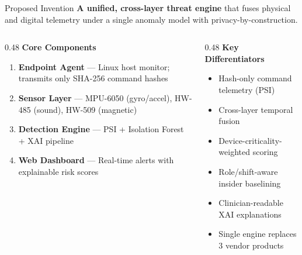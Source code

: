 \documentclass[10pt, aspectratio=169]{beamer}
\begin{document}
\begin{frame}{Proposed Invention}
  \textbf{A unified, cross-layer threat engine} that fuses physical and digital telemetry
  under a single anomaly model with privacy-by-construction.
  \vspace{6pt}
  \begin{columns}[T]
    \begin{column}{0.48\textwidth}
      \textbf{\textcolor{patentblue}{Core Components}}
      \begin{enumerate}
        \item \textbf{Endpoint Agent} — Linux host monitor; transmits only SHA-256 command hashes
        \item \textbf{Sensor Layer} — MPU-6050 (gyro/accel), HW-485 (sound), HW-509 (magnetic)
        \item \textbf{Detection Engine} — PSI + Isolation Forest + XAI pipeline
        \item \textbf{Web Dashboard} — Real-time alerts with explainable risk scores
      \end{enumerate}
    \end{column}
    \begin{column}{0.48\textwidth}
      \textbf{\textcolor{patentblue}{Key Differentiators}}
      \begin{itemize}
        \item Hash-only command telemetry (PSI)
        \item Cross-layer temporal fusion
        \item Device-criticality-weighted scoring
        \item Role/shift-aware insider baselining
        \item Clinician-readable XAI explanations
        \item Single engine replaces 3 vendor products
      \end{itemize}
    \end{column}
  \end{columns}
\end{frame}
\end{document}
